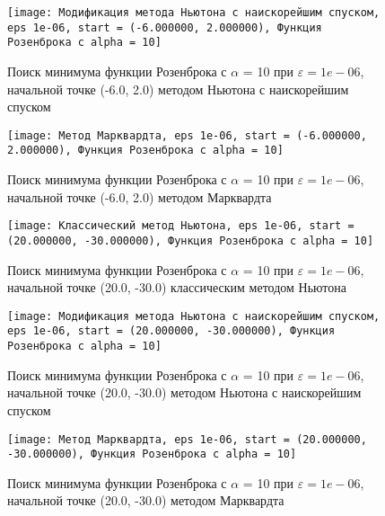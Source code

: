             \begin{figure}[H]
	        \centering
	        \texttt{[image: Модификация метода Ньютона с наискорейшим спуском, eps 1e-06, start = (-6.000000, 2.000000), Функция Розенброка с alpha = 10]}%
	        \caption{Поиск минимума функции Розенброка с $\alpha$ = 10 при $\varepsilon = 1e-06$, начальной точке (-6.0, 2.0) методом Ньютона с наискорейшим спуском}
	        \vspace*{-1.2cm}
            \end{figure}
            
            \begin{figure}[H]
	        \centering
	        \texttt{[image: Метод Марквардта, eps 1e-06, start = (-6.000000, 2.000000), Функция Розенброка с alpha = 10]}%
	        \caption{Поиск минимума функции Розенброка с $\alpha$ = 10 при $\varepsilon = 1e-06$, начальной точке (-6.0, 2.0) методом Марквардта}
	        \vspace*{-1.2cm}
            \end{figure}
            
            \begin{figure}[H]
	        \centering
	        \texttt{[image: Классический метод Ньютона, eps 1e-06, start = (20.000000, -30.000000), Функция Розенброка с alpha = 10]}%
	        \caption{Поиск минимума функции Розенброка с $\alpha$ = 10 при $\varepsilon = 1e-06$, начальной точке (20.0, -30.0) классическим методом Ньютона}
	        \vspace*{-1.2cm}
            \end{figure}
            
            \begin{figure}[H]
	        \centering
	        \texttt{[image: Модификация метода Ньютона с наискорейшим спуском, eps 1e-06, start = (20.000000, -30.000000), Функция Розенброка с alpha = 10]}%
	        \caption{Поиск минимума функции Розенброка с $\alpha$ = 10 при $\varepsilon = 1e-06$, начальной точке (20.0, -30.0) методом Ньютона с наискорейшим спуском}
	        \vspace*{-1.2cm}
            \end{figure}
            
            \begin{figure}[H]
	        \centering
	        \texttt{[image: Метод Марквардта, eps 1e-06, start = (20.000000, -30.000000), Функция Розенброка с alpha = 10]}%
	        \caption{Поиск минимума функции Розенброка с $\alpha$ = 10 при $\varepsilon = 1e-06$, начальной точке (20.0, -30.0) методом Марквардта}
	        \vspace*{-1.2cm}
            \end{figure}
            